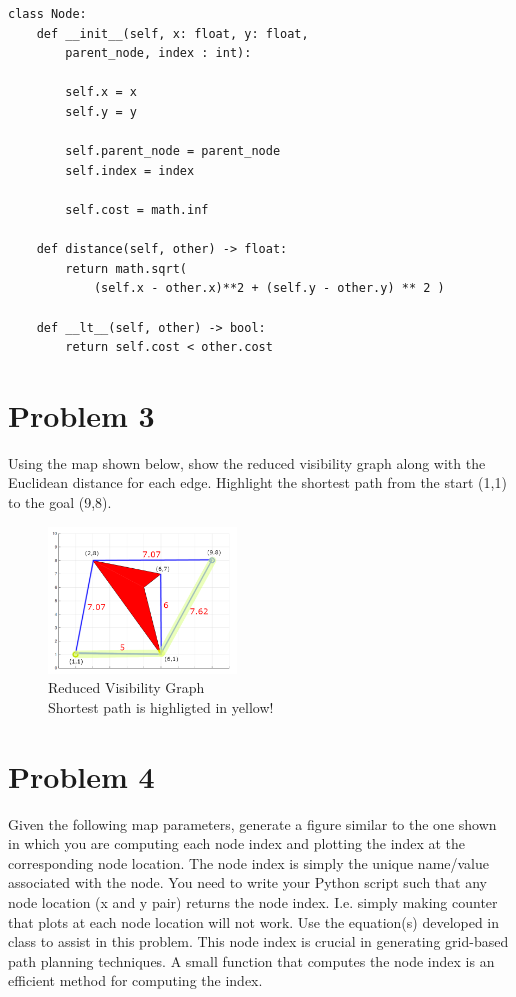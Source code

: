 \documentclass{article}
\begin{document}
\begin{mdframed}[backgroundcolor=bg]
\begin{verbatim}
class Node:
    def __init__(self, x: float, y: float, 
        parent_node, index : int):
        
        self.x = x
        self.y = y

        self.parent_node = parent_node
        self.index = index

        self.cost = math.inf
    
    def distance(self, other) -> float:
        return math.sqrt(
            (self.x - other.x)**2 + (self.y - other.y) ** 2 )
    
    def __lt__(self, other) -> bool:
        return self.cost < other.cost
\end{verbatim}
\end{mdframed}

\section*{Problem 3}
 
Using the map shown below, show the reduced visibility graph along with the Euclidean distance for 
each edge. Highlight the shortest path from the start (1,1) to the goal (9,8). 

\begin{figure}[h]
    \centering
    \includegraphics[width=5cm]{question3.png}
    \caption*{Reduced Visibility Graph\\Shortest path is highligted in yellow!}
\end{figure}

\newpage
\section*{Problem 4}

Given the following map parameters, generate a figure similar to the one shown in which you are 
computing each node index and plotting the index at the corresponding node location. The node 
index is simply the unique name/value associated with the node. You need to write your Python 
script such that any node location (x and y pair) returns the node index. I.e. simply making counter 
that plots at each node location will not work. Use the equation(s) developed in class to assist in this 
problem. This node index is crucial in generating grid-based path planning techniques. A small 
function that computes the node index is an efficient method for computing the index. 
\end{document}
